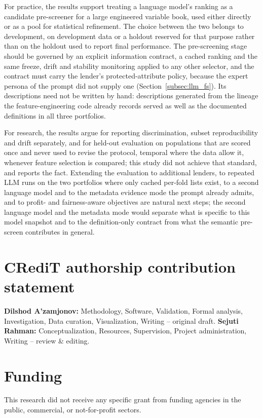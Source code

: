 \documentclass[final,5p,twocolumn]{elsarticle}
\providecommand{\DIFaddbegin}{} %
\providecommand{\DIFaddend}{} %
\begin{document}
For practice, the results support treating a language model's ranking as a candidate pre-screener for a large engineered variable book, used either directly or as a pool for statistical refinement. The choice between the two belongs to development, on development data or a holdout reserved for that purpose rather than on the holdout used to report final performance. The pre-screening stage should be governed by an explicit information contract, a cached ranking and the same freeze, drift and stability monitoring applied to any other selector, and the contract must carry the lender's protected-attribute policy, because the expert persona of the prompt did not supply one (Section~\ref{subsec:llm_fs}). Its descriptions need not be written by hand: descriptions generated from the lineage the feature-engineering code already records served as well as the documented definitions in all three portfolios.
\DIFaddbegin 

\DIFaddend For research, the results argue for reporting discrimination, subset reproducibility and drift separately, and for held-out evaluation on populations that are scored once and never used to revise the protocol, temporal where the data allow it, whenever feature selection is compared; this study did not achieve that standard, and reports the fact. Extending the evaluation to additional lenders, to repeated LLM runs on the two portfolios where only cached per-fold lists exist, to a second language model and to the metadata evidence mode the prompt already admits, and to profit- and fairness-aware objectives are natural next steps; the second language model and the metadata mode would separate what is specific to this model snapshot and to the definition-only contract from what the semantic pre-screen contributes in general.


\section*{CRediT authorship contribution statement}
\textbf{Dilshod A'zamjonov:} Methodology, Software, Validation, Formal analysis, Investigation, Data curation, Visualization, Writing -- original draft. \textbf{Sejuti Rahman:} Conceptualization, Resources, Supervision, Project administration, Writing -- review \& editing.

\section*{Funding}
This research did not receive any specific grant from funding agencies in the public, commercial, or not-for-profit sectors.
\end{document}
